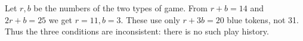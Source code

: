 Let $r,b$ be the numbers of the two types of game. From $r+b=14$ and $2r+b=25$ we get $r=11,b=3$. These use only $r+3b=20$ blue tokens, not 31. Thus the three conditions are inconsistent: there is no such play history.

